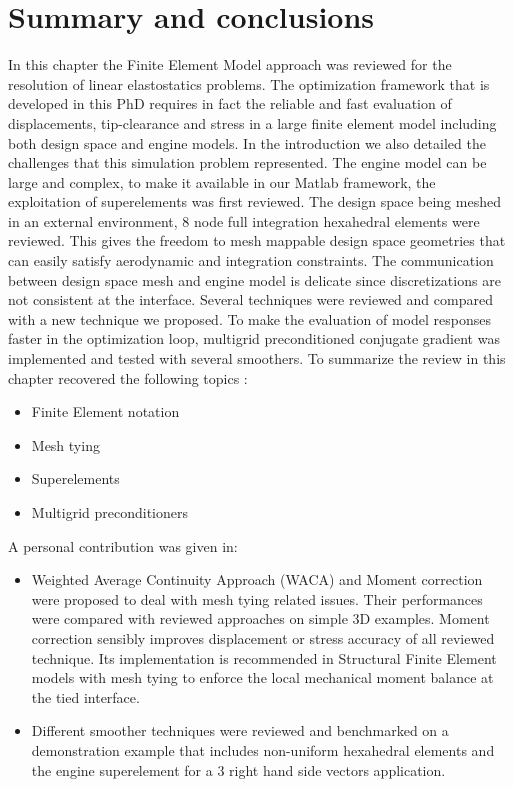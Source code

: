 \section{Summary and conclusions}      
In this chapter the Finite Element Model approach was reviewed for the resolution of linear elastostatics problems. The optimization framework that is developed in this PhD requires in fact the reliable and fast evaluation of displacements, tip-clearance and stress in a large finite element model including both design space and engine models. In the introduction we also detailed the challenges that this simulation problem represented.  The engine model can be large and complex, to make it available in our Matlab framework, the exploitation of superelements was first reviewed. The design space being meshed in an external environment, 8 node full integration hexahedral elements were reviewed. This gives the freedom to mesh mappable design space geometries that can easily satisfy aerodynamic and integration constraints. The communication between design space mesh and engine model is delicate since discretizations are not consistent at the interface. Several techniques were reviewed and compared with  a new technique we proposed. To make the evaluation of model responses faster in the optimization loop, multigrid preconditioned conjugate gradient was implemented and tested with several smoothers. To summarize the review in this chapter recovered the following topics :
\begin{itemize}
\item Finite Element notation
\item Mesh tying
\item Superelements
\item Multigrid preconditioners
\end{itemize}
A personal contribution was given in:
\begin{itemize}
\item Weighted Average Continuity Approach (WACA) and Moment correction were proposed to deal with mesh tying related issues. Their performances were compared with reviewed approaches on simple 3D examples. Moment correction sensibly improves displacement or stress accuracy of all reviewed technique. Its implementation is recommended in Structural Finite Element models with mesh tying to enforce the local mechanical moment balance at the tied interface. 
\item Different smoother techniques were reviewed and benchmarked on a  demonstration example that includes non-uniform hexahedral elements and the engine superelement for a 3 right hand side vectors application.
\end{itemize}
